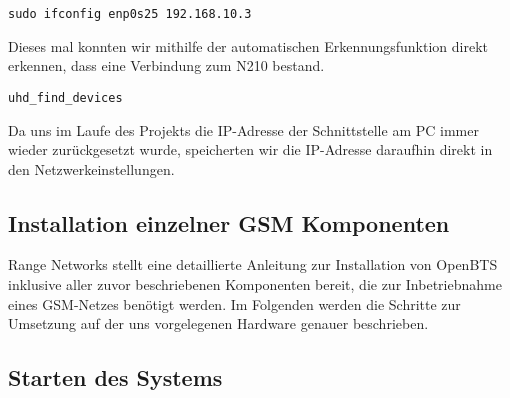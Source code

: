 \begin{lstlisting}
sudo ifconfig enp0s25 192.168.10.3
\end{lstlisting}

Dieses mal konnten wir mithilfe der automatischen Erkennungsfunktion direkt erkennen, dass eine Verbindung zum N210 bestand.
\begin{lstlisting}
uhd_find_devices
\end{lstlisting}

Da uns im Laufe des Projekts die IP-Adresse der Schnittstelle am PC immer wieder zurückgesetzt wurde, speicherten wir die IP-Adresse daraufhin direkt in den Netzwerkeinstellungen.

\subsection{Installation einzelner GSM Komponenten}\label{GSM_Komp}
Range Networks stellt eine detaillierte Anleitung zur Installation von OpenBTS inklusive aller zuvor beschriebenen Komponenten bereit, die zur Inbetriebnahme eines GSM-Netzes benötigt werden. Im Folgenden werden die Schritte zur Umsetzung auf der uns vorgelegenen Hardware genauer beschrieben.

\subsection{Starten des Systems}
